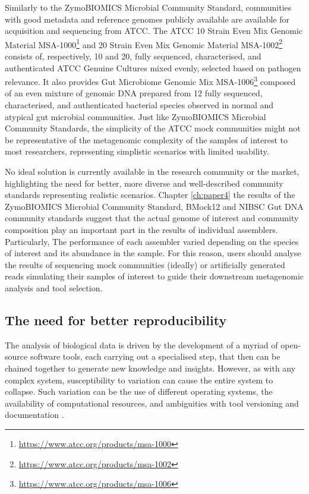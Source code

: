 Similarly to the ZymoBIOMICS Microbial Community Standard, communities with good metadata and reference genomes publicly available are available for acquisition and sequencing from \ac{ATCC}. The \ac{ATCC} 10 Strain Even Mix Genomic Material MSA-1000\footnote{\url{https://www.atcc.org/products/msa-1000}} and 20 Strain Even Mix Genomic Material MSA-1002\footnote{\url{https://www.atcc.org/products/msa-1002}} consists of, respectively, 10 and 20, fully sequenced, characterised, and authenticated \ac{ATCC} Genuine Cultures mixed evenly, selected based on pathogen relevance. It also provides Gut Microbiome Genomic Mix MSA-1006\footnote{\url{https://www.atcc.org/products/msa-1006}} composed of an even mixture of genomic DNA prepared from 12 fully sequenced, characterised, and authenticated bacterial species observed in normal and atypical gut microbial communities. Just like ZymoBIOMICS Microbial Community Standards, the simplicity of the ATCC mock communities might not be representative of the metagenomic complexity of the samples of interest to most researchers, representing simplistic scenarios with limited usability.

No ideal solution is currently available in the research community or the market, highlighting the need for better, more diverse and well-described community standards representing realistic scenarios. Chapter \ref{ch:paper4} the results of the ZymoBIOMICS Microbial Community Standard, BMock12 and NIBSC Gut DNA community standards suggest that the actual genome of interest and community composition play an important part in the results of individual assemblers. Particularly, The performance of each assembler varied depending on the species of interest and its abundance in the sample. For this reason, users should analyse the results of sequencing mock communities (ideally) or artificially generated reads simulating their samples of interest to guide their downstream metagenomic analysis and tool selection.


\subsection{The need for better reproducibility}

The analysis of biological data is driven by the development of a myriad of open-source software tools, each carrying out a specialised step, that then can be chained together to generate new knowledge and insights. However, as with any complex system, susceptibility to variation can cause the entire system to collapse. Such variation can be the use of different operating systems, the availability of computational resources, and ambiguities with tool versioning and documentation \citep{wratten_reproducible_2021, mangul_challenges_2019}.

